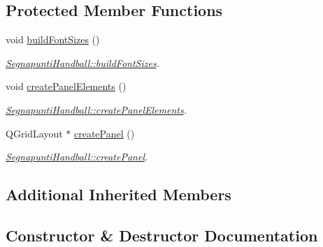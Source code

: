 \subsection*{Protected Member Functions}
\begin{DoxyCompactItemize}
\item 
\mbox{\label{classSegnapuntiHandball_af58954a40f61cc590bba6f1959dea25a}} 
void \mbox{\hyperlink{classSegnapuntiHandball_af58954a40f61cc590bba6f1959dea25a}{build\+Font\+Sizes}} ()
\begin{DoxyCompactList}\small\item\em \mbox{\hyperlink{classSegnapuntiHandball_af58954a40f61cc590bba6f1959dea25a}{Segnapunti\+Handball\+::build\+Font\+Sizes}}. \end{DoxyCompactList}\item 
\mbox{\label{classSegnapuntiHandball_a4802d860985b26f96164ddaf43532087}} 
void \mbox{\hyperlink{classSegnapuntiHandball_a4802d860985b26f96164ddaf43532087}{create\+Panel\+Elements}} ()
\begin{DoxyCompactList}\small\item\em \mbox{\hyperlink{classSegnapuntiHandball_a4802d860985b26f96164ddaf43532087}{Segnapunti\+Handball\+::create\+Panel\+Elements}}. \end{DoxyCompactList}\item 
Q\+Grid\+Layout $\ast$ \mbox{\hyperlink{classSegnapuntiHandball_a9ec2eff0a86fe7fad3b03a0f013af603}{create\+Panel}} ()
\begin{DoxyCompactList}\small\item\em \mbox{\hyperlink{classSegnapuntiHandball_a9ec2eff0a86fe7fad3b03a0f013af603}{Segnapunti\+Handball\+::create\+Panel}}. \end{DoxyCompactList}\end{DoxyCompactItemize}
\subsection*{Additional Inherited Members}


\subsection{Constructor \& Destructor Documentation}
\mbox{\label{classSegnapuntiHandball_a0581dd7d17d9a2d4acef3ec91e6009a6}} 
